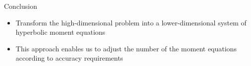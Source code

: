 \begin{frame}{Conclusion}
		\begin{itemize}
			\item Transform the high-dimensional problem into a lower-dimensional system of hyperbolic moment equations
			\item This approach enables us to adjust the number of the moment equations according to accuracy requirements
		\end{itemize} 
\end{frame}
